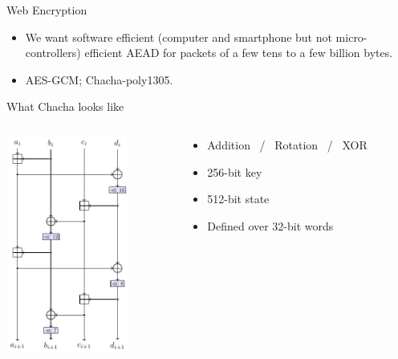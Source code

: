 \documentclass[presentation,aspectratio=1610]{beamer}
\begin{document}
\begin{frame}{Web Encryption}
  \begin{center}

    \begin{itemize}
    \item<6-> We want \alert{software efficient} (computer and smartphone but not micro-controllers) efficient \alert{AEAD} for packets of a few tens to a few billion bytes.
    \item<7> AES-GCM; Chacha-poly1305.
    \end{itemize}
  \end{center}
\end{frame}


\begin{frame}{What Chacha looks like}
  \begin{columns}
    \hfill
    \begin{column}{0.4\textwidth}
      \begin{center}
        \includegraphics[width=4cm]{./figures/chacha}
      \end{center}
    \end{column}
    \hfill
    \begin{column}{0.4\textwidth}
      \begin{itemize}
      \item Addition ~/~ Rotation ~/~ XOR
      \item 256-bit key
      \item 512-bit state
      \item Defined over 32-bit words
      \end{itemize}
    \end{column}
    \hfill
  \end{columns}
\end{frame}
\end{document}
